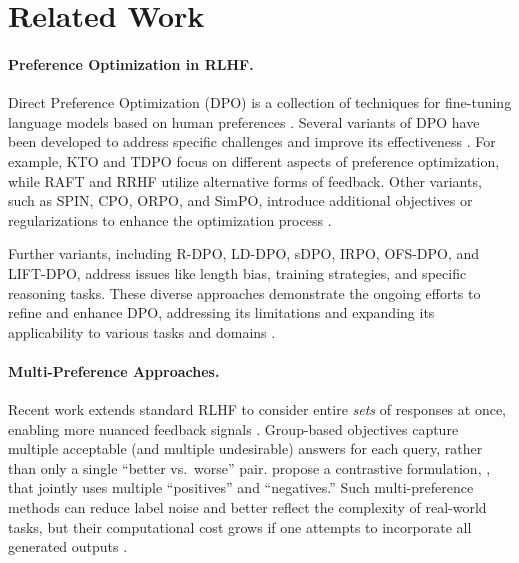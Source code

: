 \section{Related Work}
\label{sec:related_work_extended}

\paragraph{Preference Optimization in RLHF.}
Direct Preference Optimization (DPO) is a collection of techniques for fine-tuning language models based on human preferences \cite{rafailov2024direct}. Several variants of DPO have been developed to address specific challenges and improve its effectiveness \cite{ethayarajh2024kto,zeng2024token,dong2023raft,yuan2023rrhf}. For example, KTO and TDPO focus on different aspects of preference optimization, while RAFT and RRHF utilize alternative forms of feedback. Other variants, such as SPIN, CPO, ORPO, and SimPO, introduce additional objectives or regularizations to enhance the optimization process \cite{chen2024self,xu2024contrastive,hong2024orpo,meng2024simpo}.

Further variants, including R-DPO, LD-DPO, sDPO, IRPO, OFS-DPO, and LIFT-DPO, address issues like length bias, training strategies, and specific reasoning tasks. These diverse approaches demonstrate the ongoing efforts to refine and enhance DPO, addressing its limitations and expanding its applicability to various tasks and domains \cite{park2024disentangling,liu2024iterative,pang2024iterative,qi2024online, yuan2024following}.

\paragraph{Multi-Preference Approaches.}
Recent work extends standard RLHF to consider entire \emph{sets} of responses at once, enabling more nuanced feedback signals \citep{rafailov2024direct, cui2023ultrafeedback, chen2024noise}. Group-based objectives capture multiple acceptable (and multiple undesirable) answers for each query, rather than only a single “better vs.\ worse” pair. \citet{gupta2024swepo} propose a contrastive formulation, \swepo, that jointly uses multiple “positives” and “negatives.” Such multi-preference methods can reduce label noise and better reflect the complexity of real-world tasks, but their computational cost grows if one attempts to incorporate all generated outputs \citep{cui2023ultrafeedback, chen2024noise}.

